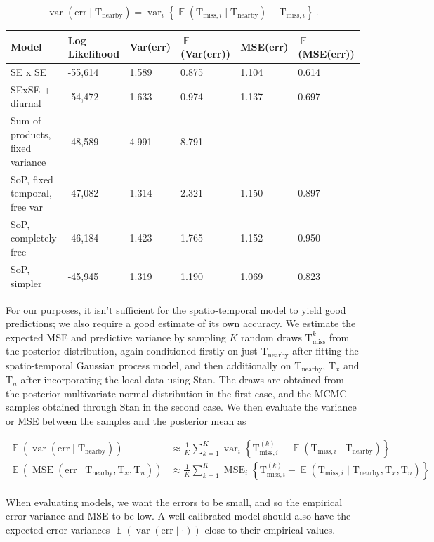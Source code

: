 \documentclass[letter]{article}
\newcommand{\genericdel}[3]{%
      \left#1#3\right#2
    }
\newcommand{\del}[1]{\genericdel(){#1}}
\newcommand{\cbr}[1]{\genericdel\{\}{#1}}
\DeclareMathOperator{\E}{\mathbb{E}}
\DeclareMathOperator{\var}{{var}}
\DeclareMathOperator{\mse}{{MSE}}
\newcommand{\T}{\mathrm{T}}
\newcommand{\Tn}{\T_{n}}
\newcommand{\Tx}{\T_{x}}
\newcommand{\miss}{\mathrm{miss}}
\newcommand{\obs}{\mathrm{nearby}}
\newcommand{\error}{\mathrm{err}}
\newcommand{\eqlabel}[1]{\label{#1}}
\begin{document}
\begin{equation}
    \eqlabel{eq:varerr}
    \var\del{\error \mid \T_\obs} = \var_i \cbr{\E\del{\T_{\miss,i} \mid \T_\obs} - \T_{\miss,i}}\,.
\end{equation}

\begin{longtable}[]{@{}llllll@{}}
\toprule
Model & Log Likelihood & Var(err) & \(\E\)(Var(err)) & MSE(err) & \(\E\)(MSE(err))\tabularnewline
\midrule
\endhead
SE x SE & -55,614 & 1.589 & 0.875 & 1.104 & 0.614\tabularnewline
SExSE + diurnal & -54,472 & 1.633 & 0.974 & 1.137 & 0.697\tabularnewline
Sum of products, fixed variance & -48,589 & 4.991 & 8.791 & &\tabularnewline
SoP, fixed temporal, free var & -47,082 & 1.314 & 2.321 & 1.150 & 0.897\tabularnewline
SoP, completely free & -46,184 & 1.423 & 1.765 & 1.152 & 0.950\tabularnewline
SoP, simpler & -45,945 & 1.319 & 1.190 & 1.069 & 0.823\tabularnewline
\bottomrule
\end{longtable}

For our purposes, it isn't sufficient for the spatio-temporal model to yield good predictions; we also require a good estimate of its own accuracy.
We estimate the expected MSE and predictive variance by sampling \(K\) random draws \(\T^k_\miss\) from the posterior distribution, again conditioned firstly on just \(\T_\obs\) after fitting the spatio-temporal Gaussian process model, and then additionally on \(\T_\obs\), \(\Tx\) and \(\Tn\) after incorporating the local data using Stan.
The draws are obtained from the posterior multivariate normal distribution in the first case, and the MCMC samples obtained through Stan in the second case.
We then evaluate the variance or MSE between the samples and the posterior mean as

\begin{equation}
\begin{split}
    \E \del{\var\del{\error \mid \T_\obs}} &\approx \frac{1}{K} \sum_{k=1}^K \var_i \cbr{\T^{(k)}_{\miss,i} - \E\del{\T_{\miss,i} \mid \T_\obs}} \\
    \E \del{\mse\del{\error \mid \T_\obs,\Tx,\Tn}} &\approx \frac{1}{K} \sum_{k=1}^K \mse_i \cbr{\T^{(k)}_{\miss,i} - \E\del{\T_{\miss,i} \mid \T_\obs,\Tx,\Tn}} \\
\end{split}
\end{equation}

When evaluating models, we want the errors to be small, and so the empirical error variance and MSE to be low. A well-calibrated model should also have the expected error variances \(\E \del{\var\del{\error \mid \cdot}}\) close to their empirical values.
\end{document}
